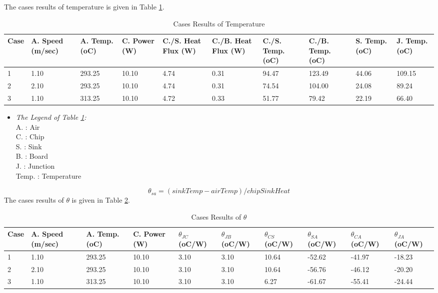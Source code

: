 \documentclass[letterpaper,12pt]{article}
\begin{document}
The cases results of temperature is given in Table \ref{tab:cases1}.
\\
\begin{table}[!h!tbp]
\begin{center}
\begin{tabular}{| l | p{1.5cm} | p{1cm} | p{1cm} | p{2cm} | p{2cm} | p{1.25cm} | p{1.25cm} | p{1.25cm} | p{1.25cm} | }
\hline
Case & A. Speed (m/sec) & A. Temp. (oC) & C. Power (W) & C./S. Heat Flux (W) & C./B. Heat Flux (W) & C./S. Temp. (oC) & C./B. Temp. (oC) & S. Temp. (oC) & J. Temp. (oC) \\
\hline
1 & 1.10 & 293.25 & 10.10 & 4.74 & 0.31 & 94.47 & 123.49 & 44.06 & 109.15 \\
\hline
2 & 2.10 & 293.25 & 10.10 & 4.74 & 0.31 & 74.54 & 104.00 & 24.08 & 89.24 \\
\hline
3 & 1.10 & 313.25 & 10.10 & 4.72 & 0.33 & 51.77 & 79.42 & 22.19 & 66.40 \\
\hline
\end{tabular}
\caption{\label{tab:cases1}
Cases Results of Temperature}
\end{center}
\end{table}
\begin{itemize}
\item{\emph{The Legend of Table \ref{tab:cases1}:\\}}
A. : Air\\C. : Chip\\S. : Sink\\B. : Board\\J. : Junction\\Temp. : Temperature
\end{itemize}
\vfill
\newpage
\clearpage
\begin{equation}
\theta_{sa} = ( sinkTemp - airTemp ) / chipSinkHeat
\end{equation}
The cases results of $\theta$ is given in Table \ref{tab:cases2}.\\
\begin{table}[!h!tbp]
\begin{center}
\begin{tabular}{| l | p{1.5cm} | p{1cm} | p{1cm} | p{1.5cm} | p{1.5cm} | p{1.5cm} | p{1.5cm} | p{1.5cm} | p{1.5cm} | }
\hline
Case & A. Speed (m/sec) & A. Temp. (oC) & C. Power (W) & $\theta_{JC}$ (oC/W) & $\theta_{JB}$ (oC/W) & $\theta_{CS}$ (oC/W) & $\theta_{SA}$ (oC/W) & $\theta_{CA}$ (oC/W) & $\theta_{JA}$ (oC/W) \\
\hline
1 & 1.10 & 293.25 & 10.10 & 3.10 & 3.10 & 10.64 & -52.62 & -41.97 & -18.23 \\
\hline
2 & 2.10 & 293.25 & 10.10 & 3.10 & 3.10 & 10.64 & -56.76 & -46.12 & -20.20 \\
\hline
3 & 1.10 & 313.25 & 10.10 & 3.10 & 3.10 & 6.27 & -61.67 & -55.41 & -24.44 \\
\hline
\end{tabular}
\caption{\label{tab:cases2}
Cases Results of $\theta$}
\end{center}
\end{table}
\end{document}
